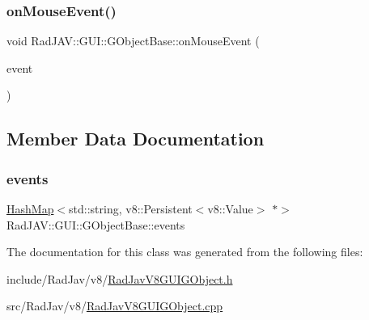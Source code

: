 \subsubsection{\texorpdfstring{on\+Mouse\+Event()}{onMouseEvent()}}
{\footnotesize\ttfamily void Rad\+J\+A\+V\+::\+G\+U\+I\+::\+G\+Object\+Base\+::on\+Mouse\+Event (\begin{DoxyParamCaption}\item[{wx\+Mouse\+Event \&}]{event }\end{DoxyParamCaption})\hspace{0.3cm}{\ttfamily [static]}}



\subsection{Member Data Documentation}
\mbox{\label{class_rad_j_a_v_1_1_g_u_i_1_1_g_object_base_a063fa71445fea6da54ea7d00f0750518}} 
\subsubsection{\texorpdfstring{events}{events}}
{\footnotesize\ttfamily \mbox{\hyperlink{namespace_rad_j_a_v_a7c83af3095bdd8035fd71ff008120f08}{Hash\+Map}}$<$std\+::string, v8\+::\+Persistent$<$v8\+::\+Value$>$ $\ast$$>$ Rad\+J\+A\+V\+::\+G\+U\+I\+::\+G\+Object\+Base\+::events\hspace{0.3cm}{\ttfamily [protected]}}



The documentation for this class was generated from the following files\+:\begin{DoxyCompactItemize}
\item 
include/\+Rad\+Jav/v8/\mbox{\hyperlink{_rad_jav_v8_g_u_i_g_object_8h}{Rad\+Jav\+V8\+G\+U\+I\+G\+Object.\+h}}\item 
src/\+Rad\+Jav/v8/\mbox{\hyperlink{_rad_jav_v8_g_u_i_g_object_8cpp}{Rad\+Jav\+V8\+G\+U\+I\+G\+Object.\+cpp}}\end{DoxyCompactItemize}
